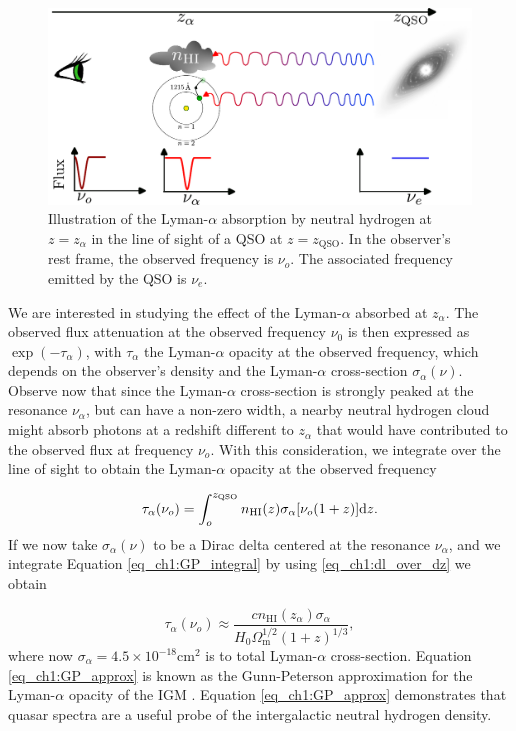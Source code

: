 \begin{figure}[t]
    \centering
    \includegraphics[width=1\linewidth]{img/lyman-alpha.pdf}
    \caption{Illustration of the Lyman-$\alpha$ absorption by neutral hydrogen at $z=z_\alpha$ in the line of sight of a QSO at $z=z_{\text{QSO}}$. In the observer's rest frame, the observed frequency is $\nu_o$. The associated frequency emitted by the QSO is $\nu_e$. }
    \label{fig_ch1:Lyman_alpha_diagram}
\end{figure}
We are interested in studying the effect of the Lyman-$\alpha$ absorbed at $z_\alpha$. The observed flux attenuation at the observed frequency $\nu_0$ is then expressed as $\exp(-\tau_\alpha)$, with $\tau_\alpha$ the Lyman-$\alpha$ opacity at the observed frequency, which depends on the observer's density and the Lyman-$\alpha$ cross-section $\sigma_\alpha(\nu)$. Observe now that since the Lyman-$\alpha$ cross-section is strongly peaked at the resonance $\nu_\alpha$, but can have a non-zero width, a nearby neutral hydrogen cloud might absorb photons at a redshift different to $z_\alpha$ that would have contributed to the observed flux at frequency $\nu_o$. With this consideration, we integrate over the line of sight to obtain the Lyman-$\alpha$ opacity at the observed frequency

\begin{equation}\label{eq_ch1:GP_integral}
    \tau_\alpha(\nu_o)=\int_o^{z_\text{QSO}} n_\text{HI}(z) \sigma_\alpha[\nu_o(1+z)] \differential z.
\end{equation}
If we now take $\sigma_\alpha(\nu)$ to be a Dirac delta centered at the resonance $\nu_\alpha$, and we integrate Equation \ref{eq_ch1:GP_integral} by using \ref{eq_ch1:dl_over_dz} we obtain

\begin{equation}\label{eq_ch1:GP_approx}
    \tau_\alpha(\nu_o)\approx \frac{cn_\text{HI}(z_\alpha)\sigma_\alpha}{H_0\Omega_\text{m}^{1/2} (1+z)^{1/3}},
\end{equation}
where now $\sigma_\alpha=4.5 \times 10^{-18}$cm$^2$ is to total Lyman-$\alpha$ cross-section.
Equation \ref{eq_ch1:GP_approx} is known as the Gunn-Peterson approximation for the Lyman-$\alpha$ opacity of the IGM \cite{GunnPeterson}. Equation \ref{eq_ch1:GP_approx} demonstrates that quasar spectra are a useful probe of the intergalactic neutral hydrogen density.

